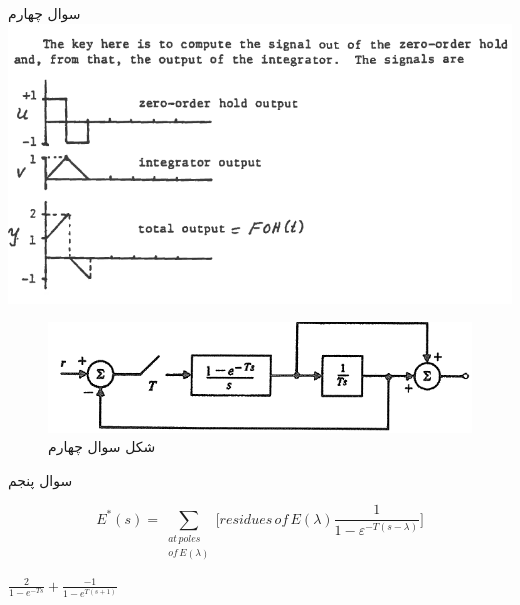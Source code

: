\documentclass{article}
\begin{document}
    
    \begin{problem}{سوال چهارم}
    	\includegraphics[width=\linewidth]{Second Series/17.png}
    	
    	
    \end{problem}
    \begin{figure}[htbp]
    	\includegraphics[width=\linewidth]{Second Series/5.png}
    	\caption{شکل سوال چهارم}
    \end{figure}
    
    \begin{problem}{سوال پنجم}
    	
    		\begin{equation}
    			{{E}^{*}}(s)=\sum\limits_{\begin{smallmatrix} 
    					at\,poles\, \\ 
    					of\,E(\lambda ) 
    			\end{smallmatrix}}{[residues\,of\,E(\lambda )}\frac{1}{1-{{\varepsilon }^{-T(s-\lambda )}}}]
    		\end{equation}
    		
    		\raggedleft
    		\centering
    		
    		$\frac{2}{1-e^{-Ts}} + \frac{-1}{1-e^{T(s+1)}}$
    	
    \end{problem}
\raggedleft    
\end{document}
